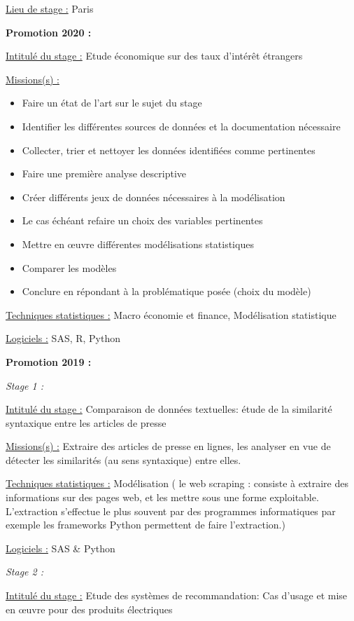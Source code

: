 \documentclass[
  letterpaper,
  DIV=11,
  numbers=noendperiod]{scrreprt}
\begin{document}
\uline{Lieu de stage :} Paris

\textbf{Promotion 2020 :}

\uline{Intitulé du stage :} Etude économique sur des taux d'intérêt
étrangers

\uline{Missions(s) :}

\begin{itemize}
\item
  Faire un état de l'art sur le sujet du stage
\item
  Identifier les différentes sources de données et la documentation
  nécessaire
\item
  Collecter, trier et nettoyer les données identifiées comme pertinentes
\item
  Faire une première analyse descriptive
\item
  Créer différents jeux de données nécessaires à la modélisation
\item
  Le cas échéant refaire un choix des variables pertinentes
\item
  Mettre en œuvre différentes modélisations statistiques
\item
  Comparer les modèles
\item
  Conclure en répondant à la problématique posée (choix du modèle)
\end{itemize}

\uline{Techniques statistiques :} Macro économie et finance,
Modélisation statistique

\uline{Logiciels :} SAS, R, Python

\textbf{Promotion 2019 :}

\emph{Stage 1 :}

\uline{Intitulé du stage :} Comparaison de données textuelles: étude de
la similarité syntaxique entre les articles de presse

\uline{Missions(s) :} Extraire des articles de presse en lignes, les
analyser en vue de détecter les similarités (au sens syntaxique) entre
elles.

\uline{Techniques statistiques :} Modélisation ( le web scraping :
consiste à extraire des informations sur des pages web, et les mettre
sous une forme exploitable. L'extraction s'effectue le plus souvent par
des programmes informatiques par exemple les frameworks Python
permettent de faire l'extraction.)

\uline{Logiciels :} SAS \& Python

\emph{Stage 2 :}

\uline{Intitulé du stage :} Etude des systèmes de recommandation: Cas
d'usage et mise en œuvre pour des produits électriques
\end{document}
